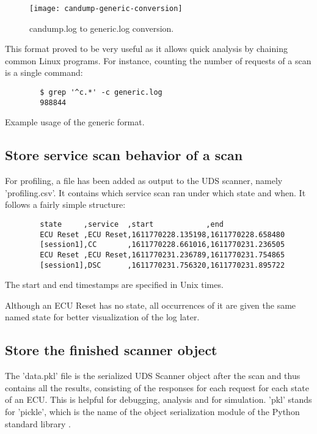 \begin{figure}[htb]
    \centering
    \texttt{[image: candump-generic-conversion]}
    \caption{candump.log to generic.log conversion.}
    \label{fig:candump-generic-conversion}
\end{figure}

This format proved to be very useful as it allows quick analysis by chaining common Linux programs.
For instance, counting the number of requests of a scan is a single command:
\begin{listing}[H]
\begin{verbatim}
        $ grep '^c.*' -c generic.log
        988844
\end{verbatim}
\caption{Example usage of the generic format.}
\label{lst:usage-generic}
\end{listing}

\subsection{Store service scan behavior of a scan}

For profiling, a file has been added as output to the UDS scanner, namely 'profiling.csv'. It contains which service scan ran under which state and when. It follows a fairly simple structure:

\begin{samepage}
    \begin{verbatim}
        state     ,service  ,start            ,end
        ECU Reset ,ECU Reset,1611770228.135198,1611770228.658480
        [session1],CC       ,1611770228.661016,1611770231.236505
        ECU Reset ,ECU Reset,1611770231.236789,1611770231.754865
        [session1],DSC      ,1611770231.756320,1611770231.895722
    \end{verbatim}
\end{samepage}

The start and end timestamps are specified in Unix times.

Although an ECU Reset has no state, all occurrences of it are given the same named state for better visualization of the log later.

\subsection{Store the finished scanner object}

The 'data.pkl' file is the serialized UDS Scanner object after the scan and thus contains all the results, consisting of the responses for each request for each state of an ECU. This is helpful for debugging, analysis and for simulation. 'pkl' stands for 'pickle', which is the name of the object serialization module of the Python standard library \cite{pickle}. 


